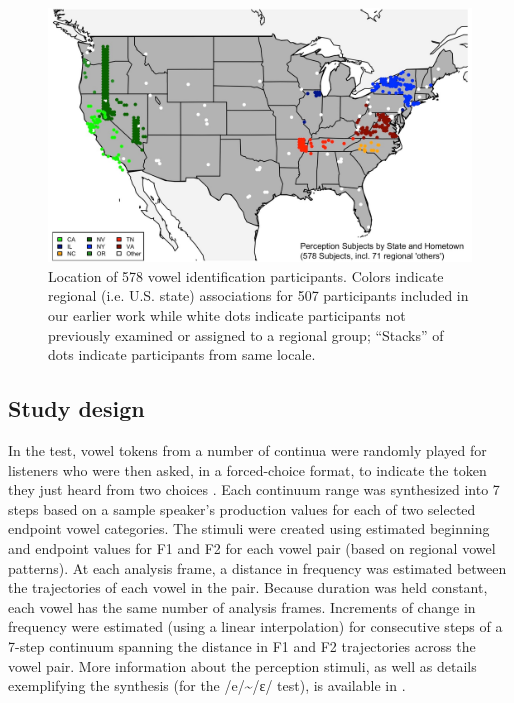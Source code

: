 \documentclass[output=paper]{LSP/langsci}
\begin{document}
\begin{figure}
\includegraphics[width=\textwidth]{illustrations/kend_frid_fig1}
\caption{Location of 578 vowel identification participants. Colors indicate regional (i.e. U.S. state) associations for 507 participants included in our earlier work while white dots indicate participants not previously examined or assigned to a regional group; ``Stacks'' of dots indicate participants from same locale.}
\label{fig:1}
\end{figure}

\subsection{Study design}
In the test, vowel tokens from a number of continua were randomly played for listeners who were then asked, in a forced-choice format, to indicate the token they just heard from two choices \citep{strange_cross-language_1995,thomas_sociophonetic_2002}. Each continuum range was synthesized into 7 steps based on a sample speaker’s production values for each of two selected endpoint vowel categories. The stimuli were created using estimated beginning and endpoint values for F1 and F2 for each vowel pair (based on regional vowel patterns). At each analysis frame, a distance in frequency was estimated between the trajectories of each vowel in the pair. Because duration was held constant, each vowel has the same number of analysis frames. Increments of change in frequency were estimated (using a linear interpolation) for consecutive steps of a 7-step continuum spanning the distance in F1 and F2 trajectories across the vowel pair. More information about the perception stimuli, as well as details exemplifying the synthesis (for the /e/{\textasciitilde}/ɛ/ test), is available in \citet{kendall_variation_2012}.
\end{document}
